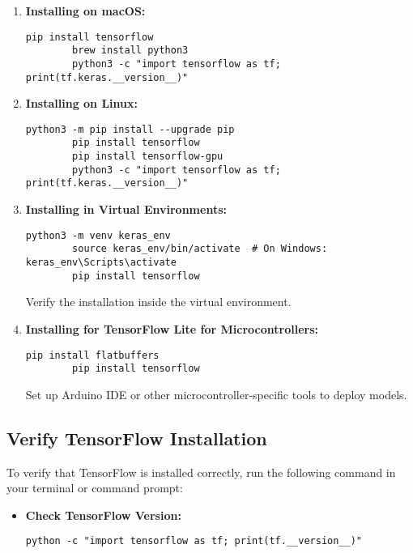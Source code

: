 \begin{enumerate}
	\item \textbf{Installing on macOS:}
	\begin{lstlisting}[caption={Installation of Keras on macOS}, label={code:bash-version}, style=bashstyle]
		pip install tensorflow
		brew install python3
		python3 -c "import tensorflow as tf; print(tf.keras.__version__)"
	\end{lstlisting}
	
	\item \textbf{Installing on Linux:}
	\begin{lstlisting}[caption={Installation of Keras on Linux}, label={code:bash-version}, style=bashstyle]
		python3 -m pip install --upgrade pip
		pip install tensorflow
		pip install tensorflow-gpu
		python3 -c "import tensorflow as tf; print(tf.keras.__version__)"
	\end{lstlisting}
	
	\item \textbf{Installing in Virtual Environments:}
	\begin{lstlisting}[caption={Installation of Keras on Virtual Env}, label={code:bash-version}, style=bashstyle]
		python3 -m venv keras_env
		source keras_env/bin/activate  # On Windows: keras_env\Scripts\activate
		pip install tensorflow
	\end{lstlisting}
	Verify the installation inside the virtual environment.
	
	\item \textbf{Installing for TensorFlow Lite for Microcontrollers:}
	\begin{lstlisting}[caption={Installation of Keras on Microcontroller},label={code:bash-version}, style=bashstyle]
		pip install flatbuffers
		pip install tensorflow
	\end{lstlisting}
	Set up Arduino IDE or other microcontroller-specific tools to deploy models.
\end{enumerate}
	
	\subsection{Verify TensorFlow Installation}
	
	To verify that TensorFlow is installed correctly, run the following command in your terminal or command prompt:
	
	\begin{itemize}
		\item \textbf{Check TensorFlow Version:}
		\begin{lstlisting}[caption={Checking TensorFlow Version}, label={code:check-tensorflow-version}, style=bashstyle]
			python -c "import tensorflow as tf; print(tf.__version__)"
		\end{lstlisting}
	\end{itemize}
	
